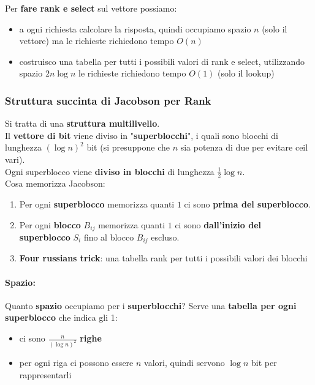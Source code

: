 Per \textbf{fare rank e select} sul vettore possiamo: 
\begin{itemize}
	\item a ogni richiesta calcolare la risposta, quindi occupiamo spazio $n$ (solo il vettore) ma le richieste richiedono tempo $O(n)$
	\item costruisco una tabella per tutti i possibili valori di rank e select, utilizzando spazio $2n \log n$ le richieste richiedono tempo $O(1)$ (solo il lookup)
\end{itemize}
 
\newpage

\subsubsection{Struttura succinta di Jacobson per Rank}

Si tratta di una \textbf{struttura multilivello}. \\

Il \textbf{vettore di bit} viene diviso in "\textbf{superblocchi}", i quali sono blocchi di lunghezza $(\log n)^2$ bit (si presuppone che $n$ sia potenza di due per evitare ceil vari).\\

Ogni superblocco viene \textbf{diviso in blocchi} di lunghezza $\frac{1}{2} \log n$.\\

Cosa memorizza Jacobson: 
\begin{enumerate}
	\item Per ogni \textbf{superblocco} memorizza quanti $1$ ci sono \textbf{prima del superblocco}.\\
	
	\item Per ogni \textbf{blocco} $B_{ij}$ memorizza quanti $1$ ci sono \textbf{dall'inizio del superblocco} $S_i$ fino al blocco $B_{ij}$ escluso.\\
	
	\item \textbf{Four russians trick}: una tabella rank per tutti i possibili valori dei blocchi
\end{enumerate}

\paragraph{Spazio:} Quanto \textbf{spazio} occupiamo per i \textbf{superblocchi}? Serve una \textbf{tabella per ogni superblocco} che indica gli 1:
\begin{itemize}
	\item ci sono $\frac{n}{(\log n)^2}$ \textbf{righe}
	\item per ogni riga ci possono essere $n$ valori, quindi servono $\log n$ bit per rappresentarli
\end{itemize}

